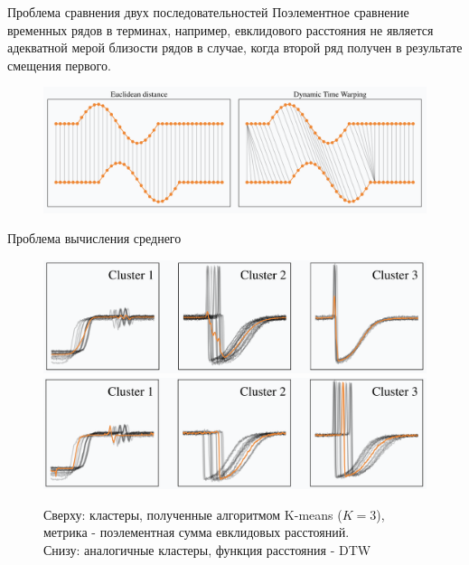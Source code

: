 \begin{frame}{Проблема сравнения двух последовательностей}
Поэлементное сравнение временных рядов в терминах, например, евклидового расстояния не является адекватной мерой близости рядов в случае, когда второй ряд получен в результате смещения первого.
\begin{figure}
    \centering
    \includegraphics[width=\textwidth]{lecture_7/figs/dtw_vs_euc.png}
\end{figure}
\end{frame}
\begin{frame}{Проблема вычисления среднего}
\begin{figure}
    \centering
    \includegraphics[width=\textwidth]{lecture_7/figs/cluster_1.png}
    \includegraphics[width=\textwidth]{lecture_7/figs/cluster_2.png}
    \caption{Сверху: кластеры, полученные алгоритмом K-means ($K = 3$), метрика - поэлементная сумма евклидовых расстояний. \\
    Снизу: аналогичные кластеры, функция расстояния - DTW}
\end{figure}
\end{frame}

